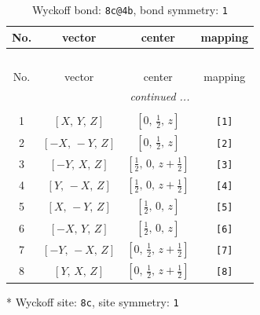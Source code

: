 \documentclass[fleqn,8pt]{jsarticle}
\begin{document}
\renewcommand{\arraystretch}{1.2}
\begin{longtable}{cccc}
\caption{Wyckoff bond: {\tt 8c@4b}, bond symmetry: {\tt 1}}
 \\
 \hline \hline
No. & vector & center & mapping \\ \hline \endfirsthead

\multicolumn{3}{l}{\tablename\ \thetable{}} \\
 \hline \hline
No. & vector & center & mapping \\ \hline \endhead

 \hline \hline
\multicolumn{3}{r}{\footnotesize\it continued ...} \\ \endfoot

 \hline \hline
\multicolumn{3}{r}{} \\ \endlastfoot

1 & $\left[ X,\, Y,\, Z \right]$ & $\left[ 0,\, \frac{1}{2},\, z \right]$ & {\tt [1]} \\ \hline
2 & $\left[ - X,\, - Y,\, Z \right]$ & $\left[ 0,\, \frac{1}{2},\, z \right]$ & {\tt [2]} \\ \hline
3 & $\left[ - Y,\, X,\, Z \right]$ & $\left[ \frac{1}{2},\, 0,\, z + \frac{1}{2} \right]$ & {\tt [3]} \\ \hline
4 & $\left[ Y,\, - X,\, Z \right]$ & $\left[ \frac{1}{2},\, 0,\, z + \frac{1}{2} \right]$ & {\tt [4]} \\ \hline
5 & $\left[ X,\, - Y,\, Z \right]$ & $\left[ \frac{1}{2},\, 0,\, z \right]$ & {\tt [5]} \\ \hline
6 & $\left[ - X,\, Y,\, Z \right]$ & $\left[ \frac{1}{2},\, 0,\, z \right]$ & {\tt [6]} \\ \hline
7 & $\left[ - Y,\, - X,\, Z \right]$ & $\left[ 0,\, \frac{1}{2},\, z + \frac{1}{2} \right]$ & {\tt [7]} \\ \hline
8 & $\left[ Y,\, X,\, Z \right]$ & $\left[ 0,\, \frac{1}{2},\, z + \frac{1}{2} \right]$ & {\tt [8]} \\
\end{longtable}
* Wyckoff site: {\tt 8c}, site symmetry: {\tt 1}
\renewcommand{\arraystretch}{1.2}
\end{document}
